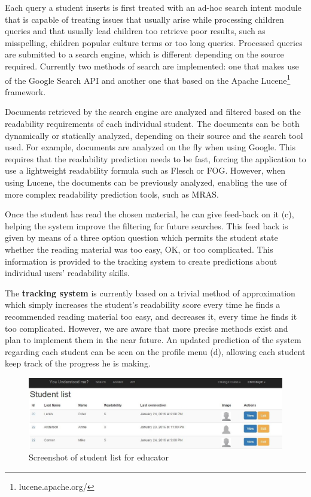\documentclass{sig-alternate-05-2015}
\begin{document}
Each query a student inserts is first treated with an ad-hoc search intent module that is capable of treating issues that usually arise while processing children queries and that usually lead children too retrieve poor results, such as misspelling, children popular culture terms or too long queries. Processed queries are submitted to a search engine, which  is different depending on the source required.  Currently two methods of search are implemented: one that makes use of the Google Search API and another one that based on the Apache Lucene\footnote{lucene.apache.org/} framework.



Documents retrieved by the search engine are analyzed and filtered based on the readability requirements of each individual student. The documents can be both dynamically or statically analyzed, depending on their source and the search tool used. For example, documents are analyzed on the fly when using Google. This requires that the readability prediction needs to be fast, forcing the application to use a lightweight readability formula such as Flesch or FOG. However, when using Lucene, the documents can be previously analyzed, enabling the use of more complex readability prediction tools, such as MRAS.


Once the student has read the chosen material, he can give feed-back on it (c), helping the system improve the filtering for future searches. This feed back is given by means of a three option question which permits the student state whether the reading material was too easy, OK, or too complicated. This information is provided to the tracking system to create predictions about individual users' readability skills.

The \textbf{tracking system} is currently based on a trivial method of approximation which simply increases the student's readability score every time he finds a recommended reading material too easy, and decreases it, every time he finds it too complicated. However, we are aware that more precise methods exist and plan to implement them in the near future. An updated prediction of the system regarding each student can be seen on the profile menu (d), allowing each student keep track of the progress he is making.
\begin{figure}[ht]
 \centering
  \includegraphics[width=1\textwidth]{creatingFigures/Capture19}
 \caption{Screenshot of student list for educator}
  \label{fig:studentList}
 \end{figure}
\end{document}

